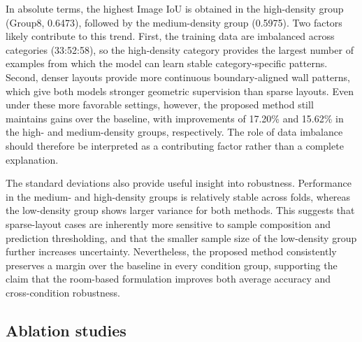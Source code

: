 In absolute terms, the highest Image IoU is obtained in the high-density group (Group8, 0.6473), followed by the medium-density group (0.5975). Two factors likely contribute to this trend. First, the training data are imbalanced across categories (33:52:58), so the high-density category provides the largest number of examples from which the model can learn stable category-specific patterns. Second, denser layouts provide more continuous boundary-aligned wall patterns, which give both models stronger geometric supervision than sparse layouts. Even under these more favorable settings, however, the proposed method still maintains gains over the baseline, with improvements of 17.20\% and 15.62\% in the high- and medium-density groups, respectively. The role of data imbalance should therefore be interpreted as a contributing factor rather than a complete explanation.

The standard deviations also provide useful insight into robustness. Performance in the medium- and high-density groups is relatively stable across folds, whereas the low-density group shows larger variance for both methods. This suggests that sparse-layout cases are inherently more sensitive to sample composition and prediction thresholding, and that the smaller sample size of the low-density group further increases uncertainty. Nevertheless, the proposed method consistently preserves a margin over the baseline in every condition group, supporting the claim that the room-based formulation improves both average accuracy and cross-condition robustness.


\subsection{Ablation studies}
\label{subsec:ablation}


